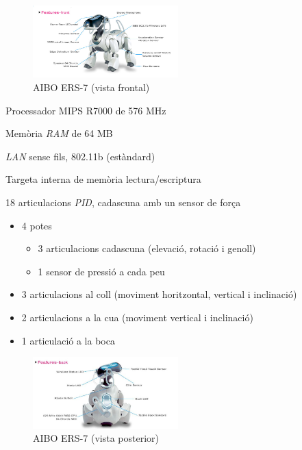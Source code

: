 \documentclass[12pt,a4paper,final,twoside]{article}
\begin{document}
\begin{itemize}
\begin{minipage}[t]{\textwidth}

\begin{figure}
                \includegraphics[width=0.5\textwidth]{Imatges/ERS-7(front)}
                \caption{AIBO ERS-7 (vista frontal) \cite{Aibo_Images}}
\end{figure}
\item Processador MIPS R7000 de 576 MHz 
\item Memòria \textit{RAM} de 64 MB
\item \textit{LAN} sense fils, 802.11b (estàndard)
\item Targeta interna de memòria lectura/escriptura 
\item 18 articulacions \textit{PID}, cadascuna amb un sensor de força
\begin{itemize}
\item 4 potes
\begin{itemize}
\item 3 articulacions cadascuna (elevació, rotació i genoll)
\item 1 sensor de pressió a cada peu
\end{itemize}
\item 3 articulacions al coll (moviment horitzontal, vertical i inclinació)
\item 2 articulacions a la cua (moviment vertical i inclinació)
\item 1 articulació a la boca
\end{itemize}
\end{minipage}

\begin{minipage}[t]{\textwidth}
\begin{figure}
                \includegraphics[width=0.5\textwidth]{Imatges/ERS-7(back)}
                \caption{AIBO ERS-7 (vista posterior) \cite{Aibo_Images}}
\end{figure}


\end{minipage}
\end{itemize}
\end{document}
